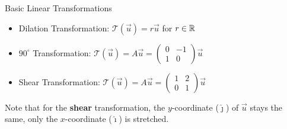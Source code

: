 \begin{impbox}{Basic Linear Transformations}{}
    \begin{itemize}
        \item Dilation Transformation: $\mathcal{T}\left(\vec{u}\right) = r\vec{u}$ for $r \in \mathbb R$
        \item $90^{\circ}$ Transformation: $\mathcal{T}\left(\vec{u}\right) = A\vec{u} = \begin{pmatrix} 0 & -1 \\ 1 & 0 \end{pmatrix}\vec{u}$
        \item Shear Transformation: $\mathcal{T}\left(\vec{u}\right) = A\vec{u} = \begin{pmatrix} 1 & 2 \\ 0 & 1 \end{pmatrix}\vec{u}$
    \end{itemize}    
\end{impbox}
Note that for the \textbf{shear} transformation, the $y$-coordinate ($\hat{\jmath}$) of $\vec{u}$ stays the same, only the $x$-coordinate ($\hat{\imath}$) is stretched.

